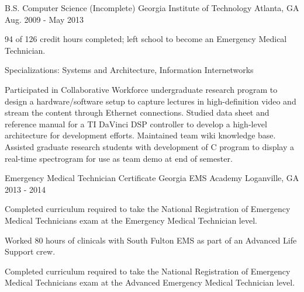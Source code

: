 

\begin{cventries}

  \cventry
    {B.S. Computer Science (Incomplete)} %
    {Georgia Institute of Technology} %
    {Atlanta, GA} %
    {Aug. 2009 - May 2013} %
    {
      \begin{cvitems} %
        \item {94 of 126 credit hours completed; left school to become an Emergency Medical Technician.}
        \item {Specializations: Systems and Architecture,  Information Internetworks}
        \item {Participated in Collaborative Workforce undergraduate research program to design a hardware/software setup to capture lectures in high-definition video and stream the content through Ethernet connections. Studied data sheet and reference manual for a TI DaVinci DSP controller to develop a high-level architecture for development efforts. Maintained team wiki knowledge base. Assisted graduate research students with development of C program to display a real-time spectrogram for use as team demo at end of semester.}
      \end{cvitems}
    }

  \cventry
    {Emergency Medical Technician Certificate} %
    {Georgia EMS Academy} %
    {Loganville, GA} %
    {2013 - 2014} %
    {
      \begin{cvitems} %
        \item {Completed curriculum required to take the National Registration of Emergency Medical Technicians exam at the Emergency Medical Technician level.}
        \item {Worked 80 hours of clinicals with South Fulton EMS as part of an Advanced Life Support crew.}
        \item {Completed curriculum required to take the National Registration of Emergency Medical Technicians exam at the Advanced Emergency Medical Technician level.}
      \end{cvitems}
    }

\end{cventries}
